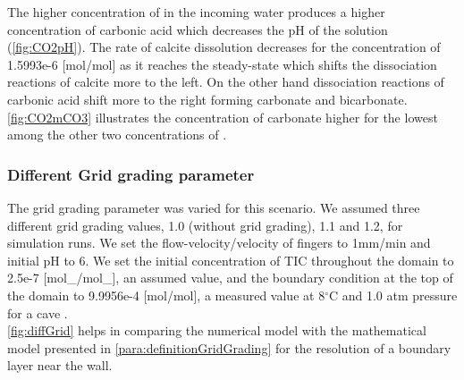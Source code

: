 The higher concentration of  in the incoming water produces a higher concentration of carbonic acid which decreases the pH of 
the solution (\cref{fig:CO2pH}). The rate of calcite dissolution decreases for the  concentration
of 1.5993e-6 [mol/mol] as it reaches the steady-state which shifts the dissociation reactions of calcite more to the left. 
On the other hand dissociation reactions of carbonic acid shift more to the right forming carbonate and bicarbonate. 
\cref{fig:CO2mCO3} illustrates the concentration of carbonate higher for the lowest among the other two concentrations of .


\subsubsection*{Different Grid grading parameter} \label{ssec:diffGrid}

The grid grading parameter was varied for this scenario. We assumed three different grid grading values, 
1.0 (without grid grading), 1.1 and 1.2, for simulation runs. We set the flow-velocity/velocity of  fingers to 1mm/min 
and initial pH to 6. We set the initial concentration of TIC throughout the domain to 2.5e-7 [mol\_/mol\_], 
an assumed value, and the boundary condition at the top of the domain to 9.9956e-4 [mol/mol], a measured value at 8$^{\circ}$C 
and 1.0 atm pressure for a cave \cite{Class2020}. \\

\cref{fig:diffGrid} helps in comparing the numerical model with the mathematical model presented in \cref{para:definitionGridGrading}
for the resolution of a boundary layer near the wall. \\

